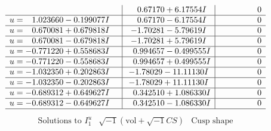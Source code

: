 \documentclass[1p]{elsarticle_modified}
\theoremstyle{definition}
\newcommand{\I}{\sqrt{-1}}
\begin{document}
$$\begin{array}{c|c|c}
 & \phantom{-}0.67170 + 6.17554 I & \phantom{-0.000000 } 0 \\ \hline\begin{aligned}
u &= \phantom{-}1.023660 - 0.199077 I\end{aligned}
 & \phantom{-}0.67170 - 6.17554 I & \phantom{-0.000000 } 0 \\ \hline\begin{aligned}
u &= \phantom{-}0.670081 + 0.679818 I\end{aligned}
 & -1.70281 - 5.79619 I & \phantom{-0.000000 } 0 \\ \hline\begin{aligned}
u &= \phantom{-}0.670081 - 0.679818 I\end{aligned}
 & -1.70281 + 5.79619 I & \phantom{-0.000000 } 0 \\ \hline\begin{aligned}
u &= -0.771220 + 0.558683 I\end{aligned}
 & \phantom{-}0.994657 - 0.499555 I & \phantom{-0.000000 } 0 \\ \hline\begin{aligned}
u &= -0.771220 - 0.558683 I\end{aligned}
 & \phantom{-}0.994657 + 0.499555 I & \phantom{-0.000000 } 0 \\ \hline\begin{aligned}
u &= -1.032350 + 0.202863 I\end{aligned}
 & -1.78029 - 11.11130 I & \phantom{-0.000000 } 0 \\ \hline\begin{aligned}
u &= -1.032350 - 0.202863 I\end{aligned}
 & -1.78029 + 11.11130 I & \phantom{-0.000000 } 0 \\ \hline\begin{aligned}
u &= -0.689312 + 0.649627 I\end{aligned}
 & \phantom{-}0.342510 + 1.086330 I & \phantom{-0.000000 } 0 \\ \hline\begin{aligned}
u &= -0.689312 - 0.649627 I\end{aligned}
 & \phantom{-}0.342510 - 1.086330 I & \phantom{-0.000000 } 0\\
 \hline 
 \end{array}$$\newpage$$\begin{array}{c|c|c}  
\text{Solutions to }I^u_{1}& \I (\text{vol} + \sqrt{-1}CS) & \text{Cusp shape}\\
 \hline 
\begin{aligned}

\end{aligned}
\end{array}$$
\end{document}
